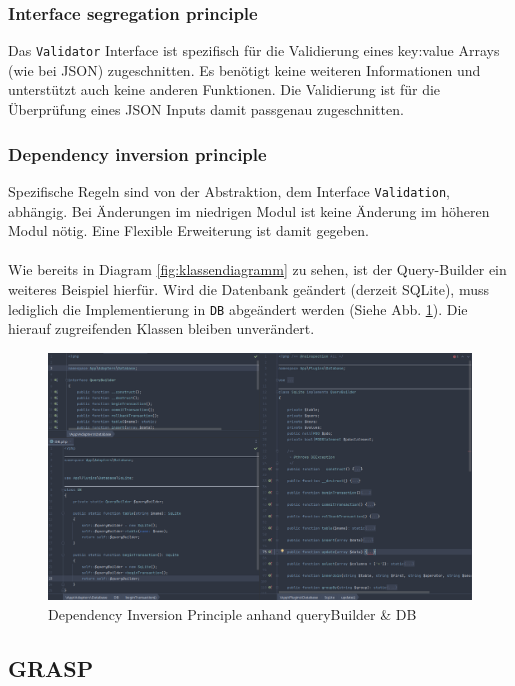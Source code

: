 \documentclass[12pt,a4paper,titlepage,ngerman,pdftex]{report}
\begin{document}
    \subsubsection{Interface segregation principle}
    Das \verb|Validator| Interface ist spezifisch für die Validierung eines key:value Arrays (wie bei JSON) zugeschnitten.
    Es benötigt keine weiteren Informationen und unterstützt auch keine anderen Funktionen.
    Die Validierung ist für die Überprüfung eines JSON Inputs damit passgenau zugeschnitten.



    \subsubsection{Dependency inversion principle}
    Spezifische Regeln sind von der Abstraktion, dem Interface \verb|Validation|, abhängig.
    Bei Änderungen im niedrigen Modul ist keine Änderung im höheren Modul nötig.
    Eine Flexible Erweiterung ist damit gegeben.\\
    \\
    Wie bereits in Diagram \ref{fig:klassendiagramm} zu sehen, ist der Query-Builder ein weiteres Beispiel hierfür.
    Wird die Datenbank geändert (derzeit SQLite), muss lediglich die Implementierung in \verb|DB| abgeändert werden (Siehe Abb. \ref{fig:figure}).
    Die hierauf zugreifenden Klassen bleiben unverändert.

    \clearpage
    \begin{figure}[!th]
        \includegraphics[width=0.8\paperheight,angle=90]{DIP.png}
        \caption{Dependency Inversion Principle anhand queryBuilder \& DB}\label{fig:figure}
    \end{figure}

    \subsection{GRASP}
    \label{subsec:grasp}
\end{document}

